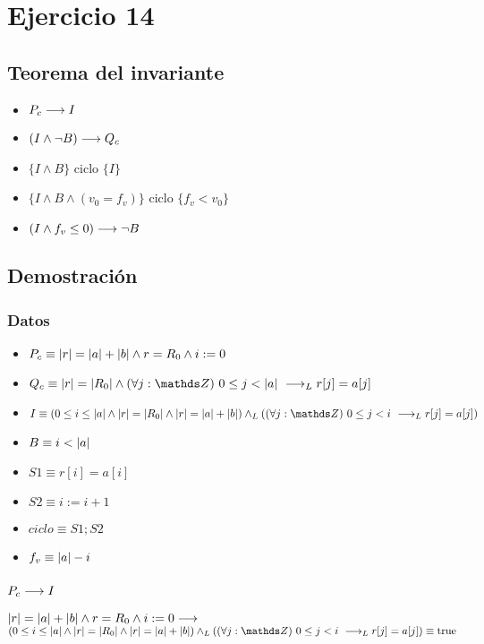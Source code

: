 \documentclass{article}
\begin{document}
\section*{Ejercicio 14}

\subsection*{Teorema del invariante}
\begin{itemize}
    \item $P_{c} \longrightarrow I$
    \item $(I \wedge \neg B) \longrightarrow Q_{c}$
    \item $\{I \wedge B\}$ ciclo $\{ I \}$
    \item $\{I \wedge B \wedge (v_{0} = f_{v})\}$ ciclo $\{f_{v} < v_{0}\}$
    \item $(I \wedge f_{v} \leq 0) \longrightarrow \neg B$
\end{itemize}

\subsection*{Demostración}

\subsubsection*{Datos}
\begin{itemize}
    \item $P_{c}    \equiv |r| = |a| + |b| \wedge r = R_{0} \wedge i:= 0$
    \item $Q_{c}    \equiv \longitud{r} = \longitud{R_{0}} \wedge \paraTodo{j}{0}{\longitud{a}} \implicaLuego r[j]=a[j]$
    \item $I        \equiv (0 \leq i \leq \longitud{a} \wedge \longitud{r} = \longitud{R_{0}} \wedge \longitud{r} = \longitud{a} + \longitud{b}) \yLuego (\paraTodo{j}{0}{i} \implicaLuego r[j]=a[j])$
    \item $B        \equiv i < |a|$
    \item $S1       \equiv r[i] = a[i]$
    \item $S2       \equiv i:= i + 1$
    \item $ciclo    \equiv S1;S2$
    \item $f_{v}    \equiv |a| - i$
\end{itemize}

\subsubsection*{$P_{c} \longrightarrow I$}
$|r| = |a| + |b| \wedge r = R_{0} \wedge i:= 0 \longrightarrow$
$(0 \leq i \leq \longitud{a} \wedge \longitud{r} = \longitud{R_{0}} \wedge \longitud{r} = \longitud{a} + \longitud{b}) \yLuego (\paraTodo{j}{0}{i} \implicaLuego r[j]=a[j]) \equiv \True$
\end{document}
